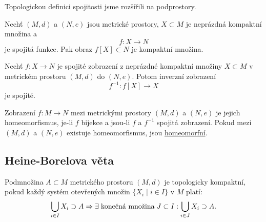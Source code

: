 \documentclass[../main.tex]{subfiles}
\begin{document}
\noindent
Topologickou definici spojitosti jsme rozšířili na podprostory.

\begin{lemma}
    Nechť $(M,d)$ a $(N,e)$ jsou metrické prostory, $X\subset M$ je neprázdná kompaktní množina a \[ f: X\to N \] je spojitá funkce.
    Pak obraz $f[X] \subset N$ je kompaktní množina.
\end{lemma}

\begin{lemma}
    Nechť $f: X\to N$ je spojité zobrazení z neprázdné kompaktní množiny $X \subset M$ v metrickém prostoru $(M,d)$ do $(N,e)$.
    Potom inverzní zobrazení \[ f^{-1}: f[X] \to X \] je spojité.
\end{lemma}

\begin{definition}[Homeomorfismus]
    Zobrazení $f: M\to N$ mezi metrickými prostory $(M,d)$ a $(N,e)$ je jejich homeomorfismus, je-li $f$ bijekce a jsou-li $f$ a $f^{-1}$ spojitá zobrazení.
    Pokud mezi $(M,d)$ a $(N,e)$ existuje homeomorfismus, jsou \underline{homeomorfní}.
\end{definition}

\subsection{Heine-Borelova věta}

\begin{definition}
    Podmnožina $A\subset M$ metrického prostoru $(M,d)$ je topologicky kompaktní, pokud každý systém otevřených množin $\{ X_i \mid i \in I \}$ v $M$ platí:
    \[ \bigcup_{i \in I} X_i \supset A \Rightarrow \exists \hspace{1mm} \text{konečná množina} \hspace{1mm} J \subset I: \bigcup_{i\in J}X_i \supset A. \]
\end{definition}
\end{document}
